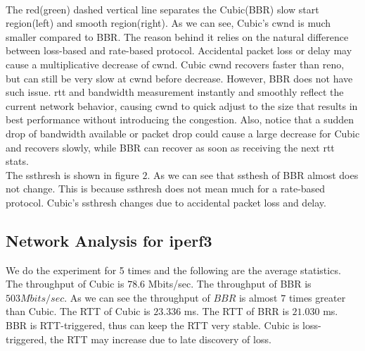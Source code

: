\documentclass{article}
\begin{document}
\\[6pt]
The red(green) dashed vertical line separates the Cubic(BBR) slow start region(left) and smooth region(right). As we can see, Cubic's cwnd is much smaller compared to BBR.
The reason behind it relies on the natural difference between loss-based and rate-based protocol. Accidental packet loss or delay may cause a multiplicative decrease of cwnd.
Cubic cwnd recovers faster than reno, but can still be very slow at cwnd before decrease. However, BBR does not have such issue. rtt and bandwidth measurement instantly and smoothly reflect the current network behavior,
causing cwnd to quick adjust to the size that results in best performance without introducing the congestion. Also, notice that a sudden drop of bandwidth available or packet drop could cause a large decrease for Cubic and 
recovers slowly, while BBR can recover as soon as receiving the next rtt stats.
\\[6pt]
The ssthresh is shown in figure $2$. As we can see that ssthesh of BBR almost does not change. This is because ssthresh does not mean much for a rate-based protocol. Cubic's ssthresh changes due to accidental packet loss and delay.

\subsection{Network Analysis for iperf3}
We do the experiment for 5 times and the following are the average statistics. The throughput of Cubic is $78.6$ Mbits/sec. The throughput of BBR is $503 Mbits/sec$. As we can see the throughput of $BBR$ is almost $7$ times greater than
Cubic. The RTT of Cubic is $23.336$ ms. The RTT of BRR is $21.030$ ms. BBR is RTT-triggered, thus can keep the RTT very stable. Cubic is loss-triggered, the RTT may increase due to late discovery of loss.
\end{document}
